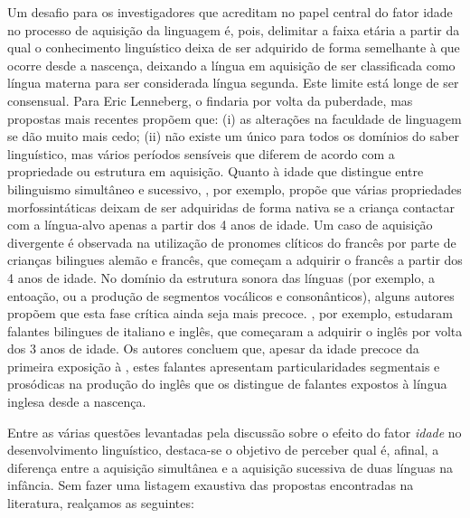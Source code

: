 \documentclass[output=paper]{LSP/langsci}
\begin{document}
Um desafio para os investigadores que acreditam no papel central do fator idade no processo de aquisição da linguagem é, pois, delimitar a faixa etária a partir da qual o conhecimento linguístico deixa de ser adquirido de forma semelhante à que ocorre desde a nascença, deixando a língua em aquisição de ser classificada como língua materna para ser considerada língua segunda. Este limite está longe de ser consensual. Para Eric Lenneberg, o  findaria por volta da puberdade, mas propostas mais recentes propõem que: (i) as alterações na faculdade de linguagem se dão muito mais cedo; (ii) não existe um único  para todos os domínios do saber linguístico, mas vários períodos sensíveis que diferem de acordo com a propriedade ou estrutura em aquisição. Quanto à idade que distingue entre bilinguismo simultâneo e sucessivo, \cite{meisel2008}, por exemplo, propõe que várias propriedades morfossintáticas deixam de ser adquiridas de forma nativa se a criança contactar com a língua-alvo apenas a partir dos 4 anos de idade. Um caso de aquisição divergente é observada na utilização de pronomes clíticos do francês por parte de crianças bilingues alemão e francês, que começam a adquirir o francês a partir dos 4 anos de idade. No domínio da estrutura sonora das línguas (por exemplo, a entoação, ou a produção de segmentos vocálicos e consonânticos), alguns autores propõem que esta fase crítica ainda seja mais precoce. \cite{flege_etal1997}, por exemplo, estudaram falantes bilingues de italiano e inglês, que começaram a adquirir o inglês por volta dos 3 anos de idade. Os autores concluem que, apesar da idade precoce da primeira exposição à , estes falantes apresentam particularidades segmentais e prosódicas na produção do inglês que os distingue de falantes expostos à língua inglesa desde a nascença.

Entre as várias questões levantadas pela discussão sobre o efeito do fator \textit{idade} no desenvolvimento linguístico, destaca-se o objetivo de perceber qual é, afinal, a diferença entre a aquisição simultânea e a aquisição sucessiva de duas línguas na infância. Sem fazer uma listagem exaustiva das propostas encontradas na literatura, realçamos as seguintes:\largerpage
\end{document}

